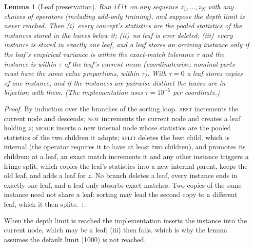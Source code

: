 \documentclass[11pt]{article}
\newtheorem{lemma}[theorem]{Lemma}
\theoremstyle{definition}
\theoremstyle{remark}
\begin{document}
\begin{lemma}[Leaf preservation]\label{lem:leaves}
Run \texttt{ifit} on any sequence $z_1,\dots,z_N$ with any choices of operators
(including add-only training), and suppose the depth limit is never reached.  Then
(i)~every concept's statistics are the pooled statistics of the instances stored in the
leaves below it; (ii)~no leaf is ever deleted; (iii)~every instance is stored in exactly
one leaf, and a leaf stores an arriving instance only if the leaf's empirical variance is within the
exact-match tolerance $\tau$ and the instance is within $\tau$ of the leaf's current mean
(coordinatewise; nominal parts must have the same value proportions, within $\tau$).  With
$\tau=0$ a leaf stores copies of one instance, and if the instances are pairwise distinct
the leaves are in bijection with them.  (The implementation uses $\tau=10^{-5}$ per
coordinate.)
\end{lemma}
\begin{proof}
By induction over the branches of the sorting loop.  \textsc{best} increments the
current node and descends; \textsc{new} increments the current node and creates a leaf
holding $z$; \textsc{merge} inserts a new internal node whose statistics are the pooled
statistics of the two children it adopts; \textsc{split} deletes the best child, which is
internal (the operator requires it to have at least two children), and promotes its
children; at a leaf, an exact match increments it and any other instance triggers a
fringe split, which copies the leaf's statistics into a new internal parent, keeps the
old leaf, and adds a leaf for $z$.  No branch deletes a leaf, every instance ends in
exactly one leaf, and a leaf only absorbs exact matches.  Two copies of the same
instance need not share a leaf: sorting may lead the second copy to a different leaf,
which it then splits.
\end{proof}

When the depth limit is reached the implementation inserts the instance into the
current node, which may be a leaf; (iii) then fails, which is why the lemma assumes the
default limit (1000) is not reached.
\end{document}
